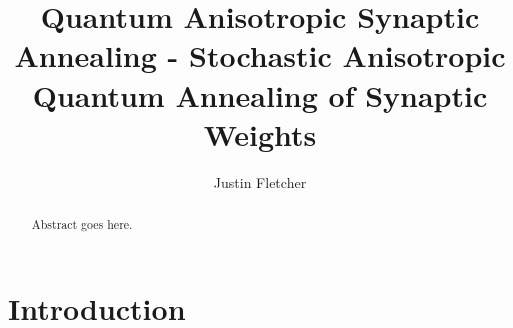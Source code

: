 \documentclass[11pt]{afthesis}
\author{Justin Fletcher}
\title{Quantum Anisotropic Synaptic Annealing - Stochastic Anisotropic Quantum Annealing of Synaptic Weights}
\begin{document}
%	

\flyleaf      			%

\disclaimerpage                 %

\titlepage			%

\approvalpage                   %

\begin{preface}
\end{preface}

\tableofcontents	%

\listoffigures  	%
\listoftables		%
\listofsymbols          %

\listofabbreviations

\begin{abstract}
	Abstract goes here. 
\end{abstract}


\chapter{Introduction}

\end{document}
